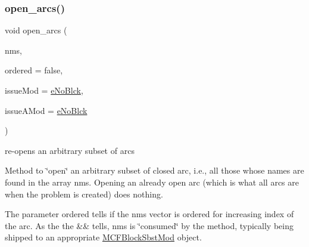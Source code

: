 \subsubsection{\texorpdfstring{open\+\_\+arcs()}{open\_arcs()}\hspace{0.1cm}{\footnotesize\ttfamily [2/2]}}
{\footnotesize\ttfamily void open\+\_\+arcs (\begin{DoxyParamCaption}\item[{\mbox{\hyperlink{class_s_m_spp__di__unipi__it_1_1_m_c_f_block_a9a1284953e2aa5222b5867c0a7f98499}{Vec\+\_\+\+Index}} \&\&}]{nms,  }\item[{const bool}]{ordered = {\ttfamily false},  }\item[{\mbox{\hyperlink{group___modification___t_y_p_e_s_ga544246d8c462e9a2d817c2c30797968f}{c\+\_\+\+Mod\+Param}}}]{issue\+Mod = {\ttfamily \mbox{\hyperlink{group___modification___t_y_p_e_s_gga48fddcdd03a03f49b7e389ca1ed938d4ada69e89c5f46e563d8a13cfa6830c136}{e\+No\+Blck}}},  }\item[{\mbox{\hyperlink{group___modification___t_y_p_e_s_ga544246d8c462e9a2d817c2c30797968f}{c\+\_\+\+Mod\+Param}}}]{issue\+A\+Mod = {\ttfamily \mbox{\hyperlink{group___modification___t_y_p_e_s_gga48fddcdd03a03f49b7e389ca1ed938d4ada69e89c5f46e563d8a13cfa6830c136}{e\+No\+Blck}}} }\end{DoxyParamCaption})}



re-\/opens an arbitrary subset of arcs 

Method to \char`\"{}open\char`\"{} an arbitrary subset of closed arc, i.\+e., all those whose names are found in the array nms. Opening an already open arc (which is what all arcs are when the problem is created) does nothing.

The parameter ordered tells if the nms vector is ordered for increasing index of the arc. As the the \&\& tells, nms is \char`\"{}consumed\char`\"{} by the method, typically being shipped to an appropriate \mbox{\hyperlink{class_s_m_spp__di__unipi__it_1_1_m_c_f_block_sbst_mod}{M\+C\+F\+Block\+Sbst\+Mod}} object.


